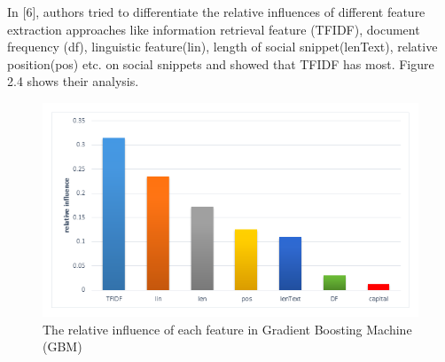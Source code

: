\documentclass{standalone}
\begin{document}
In [6], authors tried to differentiate the relative influences of different feature extraction approaches like information retrieval feature (TFIDF),  document frequency (df), linguistic feature(lin), length of social snippet(lenText), relative position(pos) etc. on  social snippets and showed that TFIDF has most. Figure 2.4 shows their analysis.

\begin{figure}[h]
				\centering
				\includegraphics[scale=0.6]{./img/rref}
				\caption{The relative influence of each feature in Gradient Boosting Machine (GBM)} \label{fig:mapComp}
\end{figure}
\end{document}
